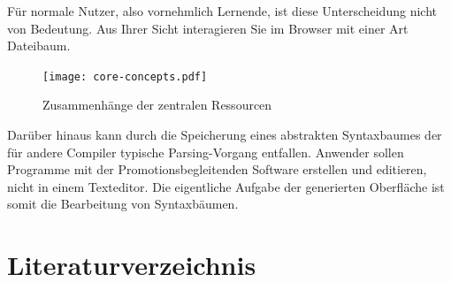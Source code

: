 \documentclass[paper=a4,fontsize=12pt,parskip=half]{scrartcl}
\begin{document}
Für normale Nutzer, also vornehmlich Lernende, ist diese Unterscheidung nicht von Bedeutung. Aus Ihrer Sicht interagieren Sie im Browser mit einer Art Dateibaum.

\begin{figure}
  \texttt{[image: core-concepts.pdf]}
  \caption{Zusammenhänge der zentralen Ressourcen}
  \label{fig:core-relations}
\end{figure}


Darüber hinaus kann durch die Speicherung eines abstrakten Syntaxbaumes der für andere Compiler typische Parsing-Vorgang entfallen. Anwender sollen Programme mit der Promotionsbegleitenden Software erstellen und editieren, nicht in einem Texteditor. Die eigentliche Aufgabe der generierten Oberfläche ist somit die Bearbeitung von Syntaxbäumen.


\section{Literaturverzeichnis}
\printbibliography[heading=none]
\end{document}
